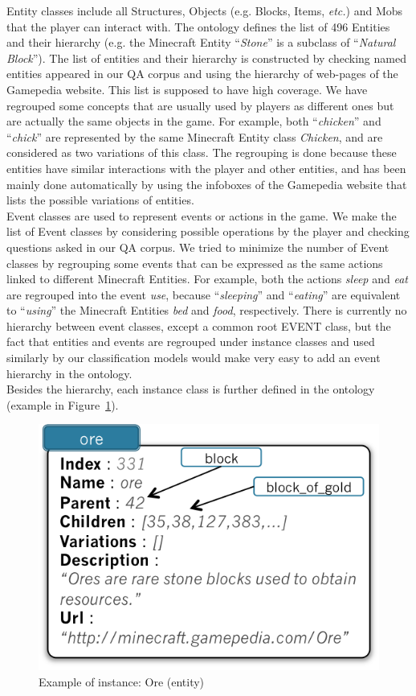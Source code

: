 \documentclass[12pt]{article}
\begin{document}
Entity classes include all Structures, Objects (e.g. Blocks, Items, \emph{etc.}) and Mobs that the player can interact with. The ontology defines the list of 496 Entities and their hierarchy (e.g. the Minecraft Entity ``\emph{Stone}'' is a subclass of ``\emph{Natural Block}''). The list of entities and their hierarchy is constructed by checking named entities appeared in our QA corpus and using the hierarchy of web-pages of the Gamepedia website. This list is supposed to have high coverage. We have regrouped some concepts that are usually used by players as different ones but are actually the same objects in the game. For example, both ``\textit{chicken}'' and ``\textit{chick}'' are represented by the same Minecraft Entity class \textit{Chicken}, and are considered as two variations of this class. The regrouping is done because these entities have similar interactions with the player and other entities, and has been mainly done automatically by using the infoboxes of the Gamepedia website that lists the possible variations of entities.\\
Event classes are used to represent events or actions in the game. We make the list of Event classes by considering possible operations by the player and checking questions asked in our QA corpus. We tried to minimize the number of Event classes by regrouping some events that can be expressed as the same actions linked to different Minecraft Entities. For example, both the actions \textit{sleep} and \textit{eat} are regrouped into the event \textit{use}, because ``\textit{sleeping}'' and ``\textit{eating}'' are equivalent to ``\textit{using}'' the Minecraft Entities \textit{bed} and \textit{food}, respectively. There is currently no hierarchy between event classes, except a common root EVENT class, but the fact that entities and events are regrouped under instance classes and used similarly by our classification models would make very easy to add an event hierarchy in the ontology.\\
Besides the hierarchy, each instance class is further defined in the ontology (example in Figure~\ref{exampleEntity}).\\

\begin{figure}[!ht]
   \centering \includegraphics[width=0.6\linewidth]{Figures/Knowledge/exampleEntity.png}
   \caption{\label{exampleEntity} Example of instance: Ore (entity)}
\end{figure}
\end{document}
